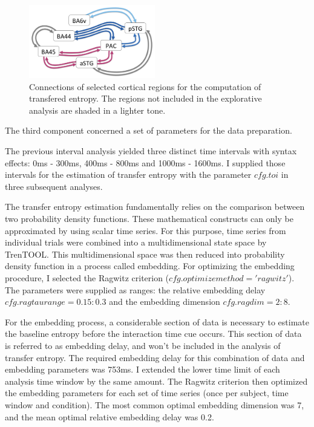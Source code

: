 \begin{figure}[h]
\begin{center}
\vspace{7mm}
\includegraphics[width=0.49\textwidth]{pics/3_4_regions.png}
\caption{\label{3.4.regions} Connections of selected cortical regions for the computation of transfered entropy. The regions not included in the explorative analysis are shaded in a lighter tone.}
\end{center}
\end{figure}

The third component concerned a set of parameters for the data preparation.

The previous interval analysis yielded three distinct time intervals with syntax effects: 0ms - 300ms, 400ms - 800ms and 1000ms - 1600ms.
I supplied those intervals for the estimation of transfer entropy with the parameter $cfg.toi$ in three subsequent analyses.

The transfer entropy estimation fundamentally relies on the comparison between two probability density functions.
These mathematical constructs can only be approximated by using scalar time series.
For this purpose, time series from individual trials were combined into a multidimensional state space by TrenTOOL.
This multidimensional space was then reduced into probability density function in a process called embedding.
For optimizing the embedding procedure, I selected the Ragwitz criterion ($cfg.optimizemethod = 'ragwitz'$).
The parameters were supplied as ranges: the relative embedding delay $cfg.ragtaurange = 0.15:0.3$ and the embedding dimension $cfg.ragdim = 2:8$.

For the embedding process, a considerable section of data is necessary to estimate the baseline entropy before the interaction time cue occurs.
This section of data is referred to as embedding delay, and won't be included in the analysis of transfer entropy.
The required embedding delay for this combination of data and embedding parameters was 753ms.
I extended the lower time limit of each analysis time window by the same amount.
The Ragwitz criterion then optimized the embedding parameters for each set of time series (once per subject, time window and condition).
The most common optimal embedding dimension was 7, and the mean optimal relative embedding delay was 0.2.

